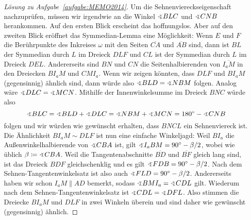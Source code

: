 \begin{proof}[Lösung zu Aufgabe~\ref{aufgabe:MEMO2014}]
	Um die Sehnenviereckseigenschaft nachzuprüfen, müssen wir irgendwie an die Winkel $\winkel BLC$ und $\winkel CNB$ herankommen. Auf den ersten Blick erscheint das hoffnungslos. Aber auf den zweiten Blick eröffnet das Symmedian-Lemma eine Möglichkeit: Wenn $E$ und $F$ die Berührpunkte des Inkreises $\omega$ mit den Seiten $\overline{CA}$ und $\overline{AB}$ sind, dann ist $BL$ der Symmedian durch $L$ im Dreieck $DLF$ und $CL$ ist der Symmedian durch $L$ im Dreieck $DEL$. Andererseits sind $BN$ und $CN$ die Seitenhalbierenden von $\overline{I_aM}$ in den Dreiecken $BI_aM$ und $CMI_a$. Wenn wir zeigen könnten, dass $DLF$ und $BI_aM$ (gegensinnig) ähnlich sind, dann würde also $\winkel BLD=\winkel NBM$ folgen. Analog wäre $\winkel DLC=\winkel MCN$. Mithilfe der Innenwinkelsumme im Dreieck $BNC$ würde also
	\begin{equation*}
		\winkel BLC=\winkel BLD+\winkel DLC=\winkel NBM+\winkel MCN=180^\circ-\winkel CNB
	\end{equation*}
	folgen und wir würden wie gewünscht erhalten, dass $BNCL$ ein Sehnenviereck ist. Die Ähnlichkeit $BI_aM\sim DLF$ ist nun eine einfache Winkeljagd: Weil $BI_a$ die Außenwinkelhalbierende von $\winkel CBA$ ist, gilt $\winkel I_aBM=90^\circ-\beta/2$, wobei wie üblich $\beta\coloneqq \winkel CBA$. Weil die Tangentenabschnitte $\overline{BD}$ und $\overline{BF}$ gleich lang sind, ist das Dreieck $BDF$ gleichschenklig und es gilt $\winkel FDB=90^\circ-\beta/2$. Nach dem Sehnen-Tangentenwinkelsatz ist also auch $\winkel FLD=90^\circ-\beta/2$. Andererseits haben wir schon $I_aM\parallel AD$ bemerkt, sodass $\winkel BMI_a=\winkel CDL$ gilt. Wiederum nach dem Sehnen-Tangentenwinkelsatz ist $\winkel CDL=\winkel DFL$. Also stimmen die Dreiecke $BI_aM$ und $DLF$ in zwei Winkeln überein und sind daher wie gewünscht (gegensinnig) ähnlich.
\end{proof}

